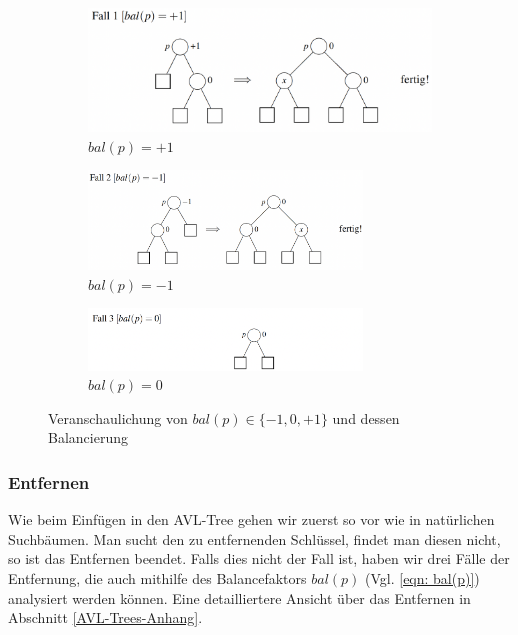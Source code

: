 \documentclass[a4paper]{article}
\begin{document}
\begin{figure}[h!]
\centering
\begin{subfigure}{0.6\textwidth}
    \includegraphics[width=\textwidth]{Pictures/AVL-bal(+1).png}
        \caption{$bal(p) = +1$}
        \label{fig: bal(p) = +1}
\end{subfigure}
\hfill
\begin{subfigure}{0.6\textwidth}
    \includegraphics[width=0.8\textwidth]{Pictures/AVL-bal(-1).png}
        \caption{$bal(p) = -1$}
        \label{fig: bal(p) = -1}
\end{subfigure}

\begin{subfigure}{0.6\textwidth}
    \includegraphics[width=0.8\textwidth]{Pictures/AVL-bal(0).png}
        \caption{$bal(p) = 0$}
        \label{fig: bal(p) = 0}
\end{subfigure}
        
\caption{Veranschaulichung von $bal(p) \in \{-1, 0, +1\}$ und dessen Balancierung}
\label{fig: bal(p) für alle}
\end{figure}

\subsubsection{Entfernen}\label{subsection EntfernenAVL}
Wie beim Einfügen in den AVL-Tree gehen wir zuerst so vor wie in natürlichen Suchbäumen. Man sucht den zu entfernenden Schlüssel, findet man diesen nicht, so ist das Entfernen beendet. Falls dies nicht der Fall ist, haben wir drei Fälle der Entfernung, die auch mithilfe des Balancefaktors $bal(p)$ (Vgl. \ref{eqn: bal(p)}) analysiert werden können. Eine detailliertere Ansicht über das Entfernen in Abschnitt \ref{AVL-Trees-Anhang}.
\end{document}
